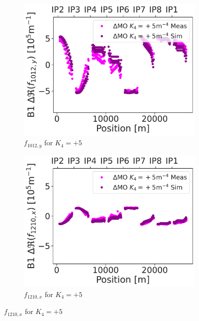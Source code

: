 \begin{figure}[!htb]
    \centering
    \begin{subfigure}{0.47\textwidth}
        \includegraphics[width=\textwidth]{./images/skew_octupoles/responses_coupling/f1012_response_meas_sim_+5_REAL.pdf}
        \caption{$f_{1012,y}$ for $K_4 = +5$}
    \end{subfigure}
    \hfill
    \begin{subfigure}{0.47\textwidth}
        \includegraphics[width=\textwidth]{./images/skew_octupoles/responses_coupling/f1210_response_meas_sim_+5_REAL.pdf}
        \caption{$f_{1210,x}$ for $K_4 = +5$}
    \end{subfigure}

\end{figure}
